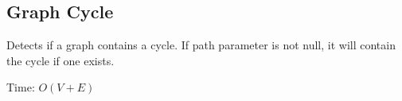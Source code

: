 \subsection{Graph Cycle}
Detects if a graph contains a cycle. If path parameter is not null, it will contain the cycle if one exists.

Time: $O(V + E)$
